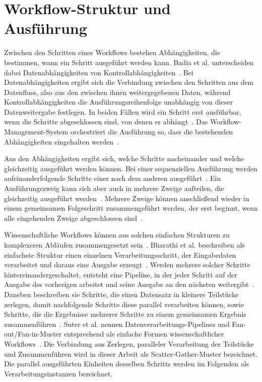 \section{Workflow-Struktur und Ausführung}
\label{sec:basics:struktur}
Zwischen den Schritten eines Workflows bestehen Abhängigkeiten, die
bestimmen, wann ein Schritt ausgeführt werden kann. Badia et al.
unterscheiden dabei Datenabhängigkeiten von
Kontrollabhängigkeiten~\cite[S.~28]{badia2017workflows}. Bei
Datenabhängigkeiten ergibt sich die Verbindung zwischen den
Schritten aus dem Datenfluss, also aus den zwischen ihnen
weitergegebenen Daten, während Kontrollabhängigkeiten die
Ausführungsreihenfolge unabhängig von dieser Datenweitergabe
festlegen. In beiden Fällen wird ein Schritt erst ausführbar, wenn
die Schritte abgeschlossen sind, von denen er
abhängt~\cite[S.~8, ~10]{russell2006patterns}. Das
Workflow-Management-System orchestriert die Ausführung so, dass die
bestehenden Abhängigkeiten eingehalten
werden~\cite[S.~4]{suter2026terminology}.
 
Aus den Abhängigkeiten ergibt sich, welche Schritte nacheinander und
welche gleichzeitig ausgeführt werden können. Bei einer sequenziellen Ausführung werden aufeinanderfolgende Schritte einer nach dem anderen
ausgeführt~\cite[S.~8]{russell2006patterns}.
Ein Ausführungszweig kann sich aber auch in mehrere Zweige
aufteilen, die gleichzeitig ausgeführt
werden~\cite[S.~9]{russell2006patterns}. Mehrere Zweige können anschließend wieder in einem gemeinsamen Folgeschritt zusammengeführt werden, der erst beginnt, wenn alle eingehenden Zweige abgeschlossen sind~\cite[S.~10]{russell2006patterns}.

Wissenschaftliche Workflows können aus solchen einfachen Strukturen
zu komplexeren Abläufen zusammengesetzt
sein~\cite[S.~2]{bharathi2008characterization}. Bharathi et al.
beschreiben als einfachste Struktur einen einzelnen
Verarbeitungsschritt, der Eingabedaten verarbeitet und daraus eine
Ausgabe erzeugt~\cite[S.~3]{bharathi2008characterization}. Werden mehrere solcher Schritte hintereinandergeschaltet, entsteht eine Pipeline, in der jeder Schritt auf der Ausgabe des vorherigen
arbeitet und seine Ausgabe an den nächsten weitergibt~\cite[S.~3]{bharathi2008characterization}.
Daneben beschreiben sie Schritte, die einen Datensatz in kleinere
Teilstücke zerlegen, damit nachfolgende Schritte diese parallel
verarbeiten können, sowie Schritte, die die Ergebnisse mehrerer
Schritte zu einem gemeinsamen Ergebnis
zusammenführen~\cite[S.~3]{bharathi2008characterization}. Suter et
al. nennen Datenverarbeitungs-Pipelines und Fan-out/Fan-in-Muster
entsprechend als einfache Formen wissenschaftlicher
Workflows~\cite[S.~4]{suter2026terminology}. Die Verbindung aus
Zerlegen, paralleler Verarbeitung der Teilstücke und Zusammenführen
wird in dieser Arbeit als Scatter-Gather-Muster bezeichnet. Die
parallel ausgeführten Einheiten desselben Schritts werden im
Folgenden als Verarbeitungsinstanzen bezeichnet.



